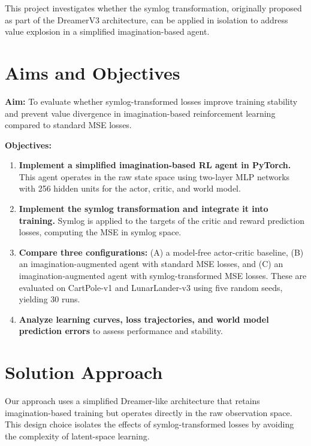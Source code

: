 This project investigates whether the symlog transformation, originally proposed as part of the DreamerV3 architecture, can be applied in isolation to address value explosion in a simplified imagination-based agent.

\section{Aims and Objectives}
\label{sec:intro_aims_obj}

\noindent\textbf{Aim:} To evaluate whether symlog-transformed losses improve training stability and prevent value divergence in imagination-based reinforcement learning compared to standard MSE losses.

\vspace{0.3cm}
\noindent\textbf{Objectives:}
\begin{enumerate}
    \item \textbf{Implement a simplified imagination-based RL agent in PyTorch.} This agent operates in the raw state space using two-layer MLP networks with 256 hidden units for the actor, critic, and world model.
    \item \textbf{Implement the symlog transformation and integrate it into training.} Symlog is applied to the targets of the critic and reward prediction losses, computing the MSE in symlog space.
    \item \textbf{Compare three configurations:} (A) a model-free actor-critic baseline, (B) an imagination-augmented agent with standard MSE losses, and (C) an imagination-augmented agent with symlog-transformed MSE losses. These are evaluated on CartPole-v1 and LunarLander-v3 using five random seeds, yielding 30 runs.
    \item \textbf{Analyze learning curves, loss trajectories, and world model prediction errors} to assess performance and stability.
\end{enumerate}

\section{Solution Approach}
\label{sec:intro_sol}

Our approach uses a simplified Dreamer-like architecture that retains imagination-based training but operates directly in the raw observation space. This design choice isolates the effects of symlog-transformed losses by avoiding the complexity of latent-space learning.

